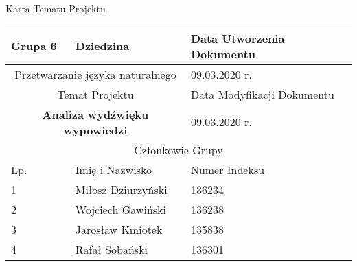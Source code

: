 \documentclass[11pt,a4paper]{article}
\begin{document}
\begin{center}
    \Large
    Karta Tematu Projektu
\end{center}
\begin{center}
\begin{table}[h]
    \centering
    \begin{tabular}{|p{3cm}|p{5cm}|p{5cm}|}
         \hline
         Grupa 6 & Dziedzina & Data Utworzenia Dokumentu \\ \hline
        \multicolumn{2}{|c|}{Przetwarzanie języka naturalnego} & 09.03.2020 r. \\ \hline
         \multicolumn{2}{|c|}{Temat Projektu} & Data Modyfikacji Dokumentu \\ \hline
         \multicolumn{2}{|c|}{\textbf{Analiza wydźwięku wypowiedzi}} & 09.03.2020 r. \\ \hline
         \multicolumn{3}{|c|}{Członkowie Grupy} \\ \hline
         Lp. & Imię i Nazwisko & Numer Indeksu \\ \hline     
         1 & Miłosz Dziurzyński & 136234 \\ \hline
         2 & Wojciech Gawiński & 136238 \\ \hline
         3 & Jarosław Kmiotek & 135838 \\ \hline
         4 & Rafał Sobański & 136301 \\ \hline
    \end{tabular}
    \label{tab:my_label}
\end{table}
\end{center}
\end{document}
